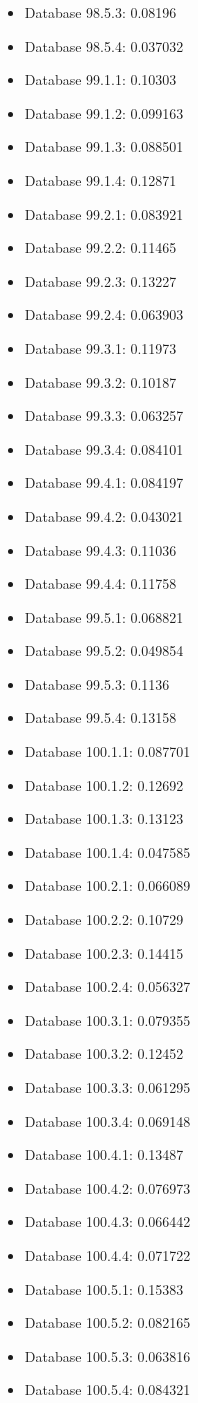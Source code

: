 \begin{itemize}
\item Database 98.5.3: 0.08196
\item Database 98.5.4: 0.037032
\item Database 99.1.1: 0.10303
\item Database 99.1.2: 0.099163
\item Database 99.1.3: 0.088501
\item Database 99.1.4: 0.12871
\item Database 99.2.1: 0.083921
\item Database 99.2.2: 0.11465
\item Database 99.2.3: 0.13227
\item Database 99.2.4: 0.063903
\item Database 99.3.1: 0.11973
\item Database 99.3.2: 0.10187
\item Database 99.3.3: 0.063257
\item Database 99.3.4: 0.084101
\item Database 99.4.1: 0.084197
\item Database 99.4.2: 0.043021
\item Database 99.4.3: 0.11036
\item Database 99.4.4: 0.11758
\item Database 99.5.1: 0.068821
\item Database 99.5.2: 0.049854
\item Database 99.5.3: 0.1136
\item Database 99.5.4: 0.13158
\item Database 100.1.1: 0.087701
\item Database 100.1.2: 0.12692
\item Database 100.1.3: 0.13123
\item Database 100.1.4: 0.047585
\item Database 100.2.1: 0.066089
\item Database 100.2.2: 0.10729
\item Database 100.2.3: 0.14415
\item Database 100.2.4: 0.056327
\item Database 100.3.1: 0.079355
\item Database 100.3.2: 0.12452
\item Database 100.3.3: 0.061295
\item Database 100.3.4: 0.069148
\item Database 100.4.1: 0.13487
\item Database 100.4.2: 0.076973
\item Database 100.4.3: 0.066442
\item Database 100.4.4: 0.071722
\item Database 100.5.1: 0.15383
\item Database 100.5.2: 0.082165
\item Database 100.5.3: 0.063816
\item Database 100.5.4: 0.084321
\end{itemize}
